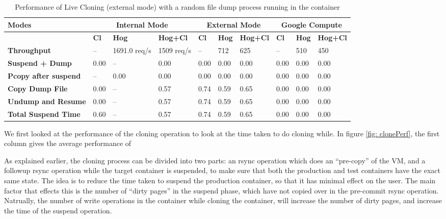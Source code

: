 \begin{table*}[ht]
  \centering
    \begin{tabular}{ | p{4cm} | l | l | l | l | l | l | l | l | l |}
    \hline
    \textbf{Modes} & \multicolumn{3}{|c|}{\textbf{Internal Mode}} & \multicolumn{3}{|c|}{\textbf{External Mode}} & \multicolumn{3}{|c|}{\textbf{Google Compute}}\\\hline
    \textbf{ } & \textbf{Cl} & \textbf{Hog} & \textbf{Hog+Cl} & \textbf{Cl} & \textbf{Hog} & \textbf{Hog+Cl} & \textbf{Cl} & \textbf{Hog} & \textbf{Hog+Cl} \\ \hline
    \hline
    \textbf{Throughput} & -- & 1691.0 req/s & 1509 req/s & -- & 712 & 625 & -- & 510 & 450\\ \hline
    \hline
    \textbf{Suspend + Dump} & 0.00 & -- & 0.00 & 0.00 & 0.00 & 0.00 & 0.00 & 0.00 & 0.00\\ \hline
    \textbf{Pcopy after suspend} &  -- & 0.00 & 0.00 & 0.00 & 0.00 & 0.00 & 0.00 & 0.00 & 0.00\\ \hline
    \textbf{Copy Dump File} & 0.00 &  -- & 0.57 & 0.74 & 0.59 & 0.65 & 0.00 & 0.00 & 0.00\\ \hline
    \textbf{Undump and Resume} & 0.00 &  -- & 0.57 & 0.74 & 0.59 & 0.65 & 0.00 & 0.00 & 0.00\\ \hline 
    \hline
    \textbf{Total Suspend Time} & 0.60 &  -- & 0.57 & 0.74 & 0.59 & 0.65 & 0.00 & 0.00 & 0.00\\ \hline
    \end{tabular}
\caption{Performance of Live Cloning (external mode) with a random file dump process running in the container}
\label{table:clonePerf}
\end{table*}


We first looked at the performance of the cloning operation to look at the time taken to do cloning while. In figure \ref {fig: clonePerf}, the first column gives the average performance of 


As explained earlier, the cloning process can be divided into two parts: an rsync operation which does an ``pre-copy'' of the VM, and a followup rsync operation while the target container is suspended, to make sure that both the production and test containers have the exact same state.
The idea is to reduce the time taken to suspend the production container, so that it has minimal effect on the user.
The main factor that effects this is the number of ``dirty pages'' in the suspend phase, which have not copied over in the pre-commit rsync operation.
Natrually, the number of write operations in the container while cloning the container, will increase the number of dirty pages, and increase the time of the suspend operation.


